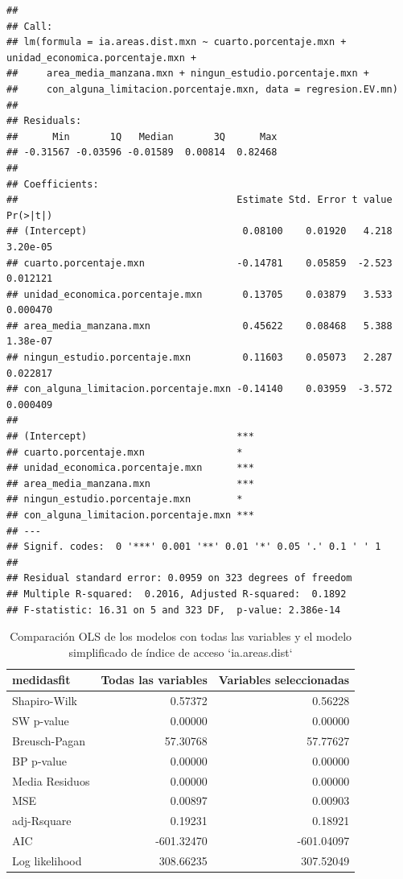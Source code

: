 \documentclass[12pt,]{book}
\begin{document}
\begin{verbatim}
## 
## Call:
## lm(formula = ia.areas.dist.mxn ~ cuarto.porcentaje.mxn + unidad_economica.porcentaje.mxn + 
##     area_media_manzana.mxn + ningun_estudio.porcentaje.mxn + 
##     con_alguna_limitacion.porcentaje.mxn, data = regresion.EV.mn)
## 
## Residuals:
##      Min       1Q   Median       3Q      Max 
## -0.31567 -0.03596 -0.01589  0.00814  0.82468 
## 
## Coefficients:
##                                      Estimate Std. Error t value Pr(>|t|)
## (Intercept)                           0.08100    0.01920   4.218 3.20e-05
## cuarto.porcentaje.mxn                -0.14781    0.05859  -2.523 0.012121
## unidad_economica.porcentaje.mxn       0.13705    0.03879   3.533 0.000470
## area_media_manzana.mxn                0.45622    0.08468   5.388 1.38e-07
## ningun_estudio.porcentaje.mxn         0.11603    0.05073   2.287 0.022817
## con_alguna_limitacion.porcentaje.mxn -0.14140    0.03959  -3.572 0.000409
##                                         
## (Intercept)                          ***
## cuarto.porcentaje.mxn                *  
## unidad_economica.porcentaje.mxn      ***
## area_media_manzana.mxn               ***
## ningun_estudio.porcentaje.mxn        *  
## con_alguna_limitacion.porcentaje.mxn ***
## ---
## Signif. codes:  0 '***' 0.001 '**' 0.01 '*' 0.05 '.' 0.1 ' ' 1
## 
## Residual standard error: 0.0959 on 323 degrees of freedom
## Multiple R-squared:  0.2016, Adjusted R-squared:  0.1892 
## F-statistic: 16.31 on 5 and 323 DF,  p-value: 2.386e-14
\end{verbatim}

\begin{table}

\caption{\label{tab:comp-lm-areasdist}Comparación OLS de los modelos con todas las variables y el modelo simplificado de índice de acceso `ia.areas.dist`}
\centering
\begin{tabular}[t]{l|r|r}
\hline
medidasfit & Todas las variables & Variables seleccionadas\\
\hline
Shapiro-Wilk & 0.57372 & 0.56228\\
\hline
SW p-value & 0.00000 & 0.00000\\
\hline
Breusch-Pagan & 57.30768 & 57.77627\\
\hline
BP p-value & 0.00000 & 0.00000\\
\hline
Media Residuos & 0.00000 & 0.00000\\
\hline
MSE & 0.00897 & 0.00903\\
\hline
adj-Rsquare & 0.19231 & 0.18921\\
\hline
AIC & -601.32470 & -601.04097\\
\hline
Log likelihood & 308.66235 & 307.52049\\
\hline
\end{tabular}
\end{table}
\end{document}

